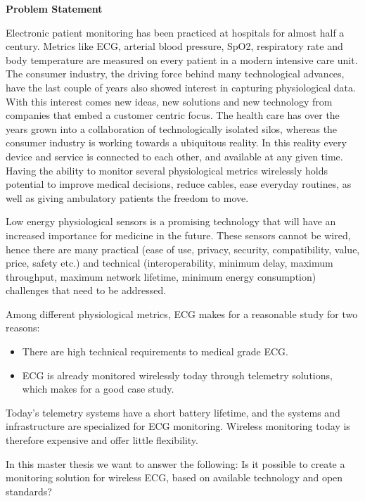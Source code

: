 \noindent
\textbf{Problem Statement} 
\newline 
	
\noindent 
Electronic patient monitoring has been practiced at hospitals for almost half a century. Metrics like ECG, arterial blood pressure, SpO2, respiratory rate and body temperature are measured on every patient in a modern intensive care unit. The consumer industry, the driving force behind many technological advances, have the last couple of years also showed interest in capturing physiological data. With this interest comes new ideas, new solutions and new technology from companies that embed a customer centric focus. The health care has over the years grown into a collaboration of technologically isolated silos, whereas the consumer industry is working towards a ubiquitous reality. In this reality every device and service is connected to each other, and available at any given time. Having the ability to monitor several physiological metrics wirelessly holds potential to improve medical decisions, reduce cables, ease everyday routines, as well as giving ambulatory patients the freedom to move. 
	
	Low energy physiological sensors is a promising technology that will have an increased importance for medicine in the future. These sensors cannot be wired, hence there are many practical (ease of use, privacy, security, compatibility, value, price, safety etc.) and technical (interoperability, minimum delay, maximum throughput, maximum network lifetime, minimum energy consumption) challenges that need to be addressed.
	
	Among different physiological metrics, ECG makes for a reasonable study for two reasons: 
	\begin{itemize}
		\item There are high technical requirements to medical grade ECG. 
		\item ECG is already monitored wirelessly today through telemetry solutions, which makes for a good case study. 
	\end{itemize}

\noindent	
Today's telemetry systems have a short battery lifetime, and the systems and infrastructure are specialized for ECG monitoring. Wireless monitoring today is therefore expensive and offer little flexibility. 

In this master thesis we want to answer the following: Is it possible to create a monitoring solution for wireless ECG, based on available technology and open standards?